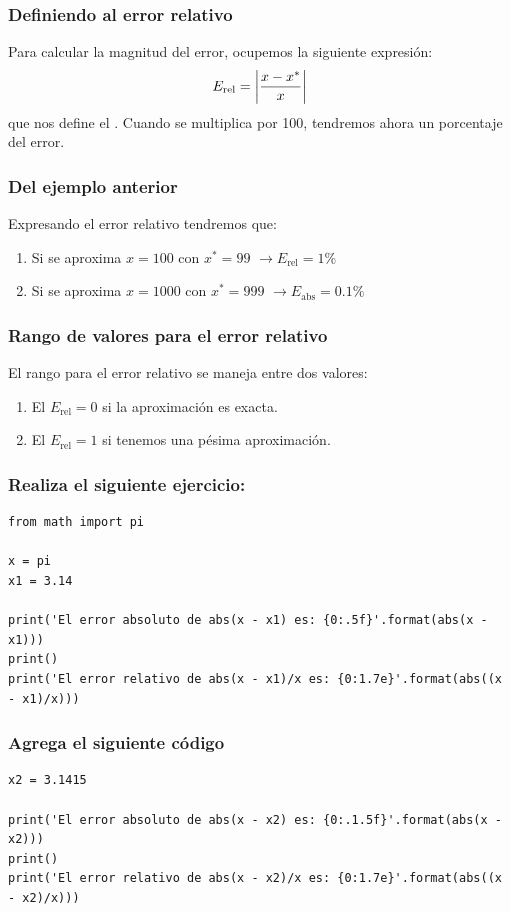 \documentclass[12pt]{beamer}
\begin{document}
\begin{frame}
\frametitle{Definiendo al error relativo}
Para calcular la magnitud del error, ocupemos la siguiente expresión:
\pause
\begin{align*}
E_{\text{rel}} = \abs{\dfrac{x - x^{*}}{x}}
\end{align*}
que nos define el . \pause Cuando se multiplica por 100, tendremos ahora un porcentaje del error.
\end{frame}
\begin{frame}
\frametitle{Del ejemplo anterior}
Expresando el error relativo tendremos que:
\pause
{}
\begin{enumerate}[<+->]
\item Si se aproxima $x = 100$ con $x^{*} = 99$ \pause $\to E_{\text{rel}} = 1\%$ \pause
\item Si se aproxima $x = 1000$ con $x^{*} = 999$ \pause $\to E_{\text{abs}} = 0.1\%$
\end{enumerate}
\end{frame}    
\begin{frame}
\frametitle{Rango de valores para el error relativo}
El rango para el error relativo se maneja entre dos valores:
\pause
{}
\begin{enumerate}[<+->]
\item El $E_{\text{rel}} = 0$ si la aproximación es exacta.
\item El $E_{\text{rel}} = 1$ si tenemos una pésima aproximación.
\end{enumerate}
\end{frame}
\begin{frame}[fragile]
\frametitle{Realiza el siguiente ejercicio:}
\begin{lstlisting}[caption=Obteniendo errores absoluto y relativo]
from math import pi

x = pi
x1 = 3.14

print('El error absoluto de abs(x - x1) es: {0:.5f}'.format(abs(x - x1)))
print()
print('El error relativo de abs(x - x1)/x es: {0:1.7e}'.format(abs((x - x1)/x)))
\end{lstlisting}
\end{frame}
\begin{frame}[fragile]
\frametitle{Agrega el siguiente código}
\begin{lstlisting}[caption=Obteniendo errores absoluto y relativo]
x2 = 3.1415

print('El error absoluto de abs(x - x2) es: {0:.1.5f}'.format(abs(x - x2)))
print()
print('El error relativo de abs(x - x2)/x es: {0:1.7e}'.format(abs((x - x2)/x)))
\end{lstlisting}	
\end{frame}
\end{document}
